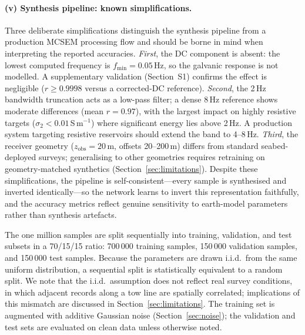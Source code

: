 \documentclass[journal]{IEEEtran}
\begin{document}
\paragraph{(v) Synthesis pipeline: known simplifications.}
Three deliberate simplifications distinguish the synthesis pipeline
from a production MCSEM processing flow and should be borne in mind
when interpreting the reported accuracies.
\emph{First}, the DC component is absent: the lowest computed
frequency is $f_\mathrm{min} = 0.05$\,Hz, so the galvanic response
is not modelled.  A supplementary validation (Section~S1) confirms
the effect is negligible ($r \geq 0.9998$ versus a corrected-DC
reference).
\emph{Second}, the 2\,Hz bandwidth truncation acts as a low-pass
filter; a dense 8\,Hz reference shows moderate differences (mean
$r = 0.97$), with the largest impact on highly resistive targets
($\sigma_2 < 0.01$\,S\,m$^{-1}$) where significant energy lies
above 2\,Hz.  A production system targeting resistive reservoirs
should extend the band to 4--8\,Hz.
\emph{Third}, the receiver geometry ($z_\mathrm{obs} = 20$\,m,
offsets 20--200\,m) differs from standard seabed-deployed surveys;
generalising to other geometries requires retraining on
geometry-matched synthetics (Section~\ref{sec:limitations}).
Despite these simplifications, the pipeline is self-consistent---every
sample is synthesised and inverted identically---so the network
learns to invert this representation faithfully, and the accuracy
metrics reflect genuine sensitivity to earth-model parameters rather
than synthesis artefacts.

The one million samples are split sequentially into training,
validation, and test subsets in a 70/15/15 ratio: 700\,000 training
samples, 150\,000 validation samples, and 150\,000 test samples.
Because the parameters are drawn i.i.d.\ from the same uniform
distribution, a sequential split is statistically equivalent to a
random split.  We note that the i.i.d.\ assumption does not reflect
real survey conditions, in which adjacent records along a tow line
are spatially correlated; implications of this mismatch are discussed
in Section~\ref{sec:limitations}.
The training set is augmented with additive Gaussian
noise (Section~\ref{sec:noise}); the validation and test sets are
evaluated on clean data unless otherwise noted.
\end{document}
